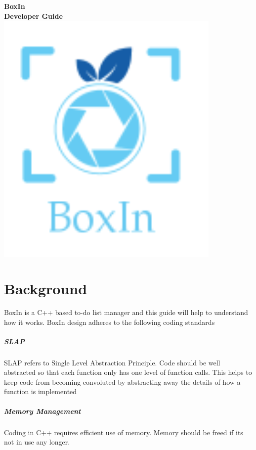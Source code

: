 \documentclass[12pt]{extarticle}
\begin{document}
\begin{center}
\bf \Huge BoxIn\\
Developer Guide
\includegraphics[width=\textwidth]{BoxIn}
\end{center}

\pagebreak

\tableofcontents

\pagebreak

\section{Background}

BoxIn is a C++ based to-do list manager and this guide will help to understand how it works. BoxIn design adheres to the following coding standards

\subparagraph{SLAP}    
SLAP refers to Single Level Abstraction Principle. Code should be well abstracted so that each function only has one level of function calls. This helps to keep code from becoming convoluted by abstracting away the details of how a function is implemented

\subparagraph{Memory Management}
Coding in C++ requires efficient use of memory. Memory should be freed if its not in use any longer.
\end{document}
